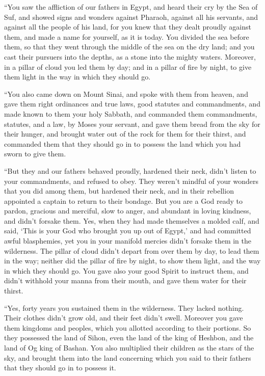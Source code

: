 \myverse{}“You saw the affliction of our fathers in Egypt, and heard their
cry by the Sea of Suf,
\myverse{}and showed signs and wonders against Pharaoh, against all his servants, and
against all the people of his land, for you knew that they dealt proudly against them, and made a name
for yourself, as it is today.
\myverse{}You divided the sea before them, so that they went through the middle of the
sea on the dry land; and you cast their pursuers into the depths, as a stone into the mighty waters.
\myverse{}Moreover, in a pillar of cloud you led them by day; and in a pillar of fire
by night, to give them light in the way in which they should go.

\myverse{}“You also came down on Mount Sinai, and spoke with them from
heaven, and gave them right ordinances and true laws, good statutes and commandments,
\myverse{}and made known to them your holy Sabbath, and commanded them commandments,
statutes, and a law, by Moses your servant,
\myverse{}and gave them bread from the sky for their hunger, and brought water out of
the rock for them for their thirst, and commanded them that they should go in to possess the land which
you had sworn to give them.

\myverse{}“But they and our fathers behaved proudly, hardened their neck,
didn’t listen to your commandments,
\myverse{}and refused to obey. They weren’t mindful of your wonders that you did among
them, but hardened their neck, and in their rebellion appointed a captain to return to their bondage.
But you are a God ready to pardon, gracious and merciful, slow to anger, and abundant in loving kindness,
and didn’t forsake them.
\myverse{}Yes, when they had made themselves a molded calf, and said, ‘This is your
God who brought you up out of Egypt,’ and had committed awful blasphemies,
\myverse{}yet you in your manifold mercies didn’t forsake them in the wilderness. The
pillar of cloud didn’t depart from over them by day, to lead them in the way; neither did the pillar of
fire by night, to show them light, and the way in which they should go.
\myverse{}You gave also your good Spirit to instruct them, and didn’t withhold your
manna from their mouth, and gave them water for their thirst.

\myverse{}“Yes, forty years you sustained them in the wilderness. They
lacked nothing. Their clothes didn’t grow old, and their feet didn’t swell.
\myverse{}Moreover you gave them kingdoms and peoples, which you allotted according
to their portions. So they possessed the land of Sihon, even the land of the king of Heshbon, and the
land of Og king of Bashan.
\myverse{}You also multiplied their children as the stars of the sky, and brought them
into the land concerning which you said to their fathers that they should go in to possess it.

